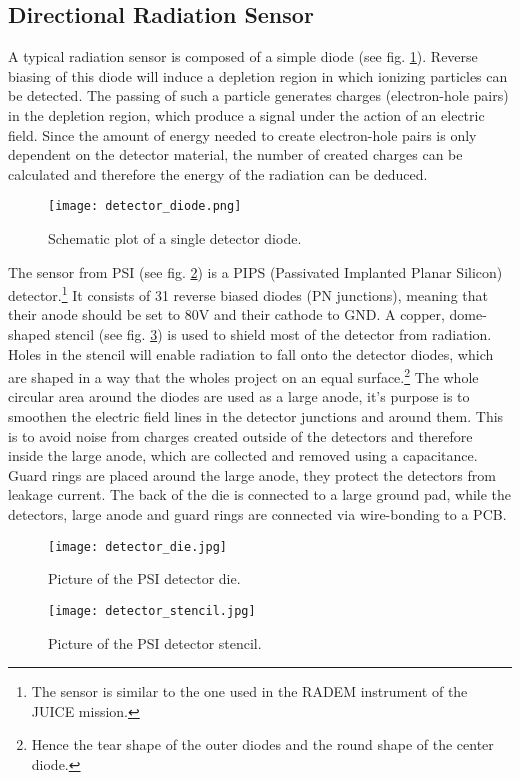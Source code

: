 \subsection{Directional Radiation Sensor}
\label{sec:radiation_sensor}
A typical radiation sensor is composed of a simple diode (see fig. \ref{fig:detector_diode}).
Reverse biasing of this diode will induce a depletion region in which ionizing particles can be detected.
The passing of such a particle generates charges (electron-hole pairs) in the depletion region, which produce a signal under the action of an electric field.
Since the amount of energy needed to create electron-hole pairs is only dependent on the detector material, the number of created charges can be calculated and therefore the energy of the radiation can be deduced.\cite{rossi2006pixel}

\begin{figure}[H]
    \centering
    \texttt{[image: detector\_diode.png]}
    \caption[Schematic Detector Diode]{Schematic plot of a single detector diode.\cite{am2016semiconductor}}
    \label{fig:detector_diode}
\end{figure}

The sensor from PSI (see fig. \ref{fig:detector_die}) is a PIPS (Passivated Implanted Planar Silicon) detector.\footnote{The sensor is similar to the one used in the RADEM instrument of the JUICE mission.}
It consists of 31 reverse biased diodes (PN junctions), meaning that their anode should be set to 80V and their cathode to GND.
A copper, dome-shaped stencil (see fig. \ref{fig:detector_stencil}) is used to shield most of the detector from radiation.
Holes in the stencil will enable radiation to fall onto the detector diodes, which are shaped in a way that the wholes project on an equal surface.\footnote{Hence the tear shape of the outer diodes and the round shape of the center diode.}
The whole circular area around the diodes are used as a large anode, it's purpose is to smoothen the electric field lines in the detector junctions and around them.
This is to avoid noise from charges created outside of the detectors and therefore inside the large anode, which are collected and removed using a capacitance.
Guard rings are placed around the large anode, they protect the detectors from leakage current.
The back of the die is connected to a large ground pad, while the detectors, large anode and guard rings are connected via wire-bonding to a PCB.

\begin{figure}[h!]
    \centering
    \texttt{[image: detector\_die.jpg]}
    \caption[PSI Detector Die]{Picture of the PSI detector die.}
    \label{fig:detector_die}
\end{figure}

\begin{figure}[h!]
    \centering
    \texttt{[image: detector\_stencil.jpg]}
    \caption[PSI Detector Stencil]{Picture of the PSI detector stencil.}
    \label{fig:detector_stencil}
\end{figure}
